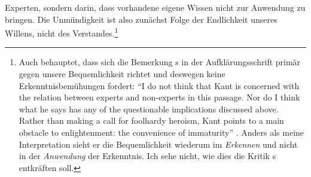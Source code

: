 Experten, sondern darin, dass vorhandene eigene Wissen nicht zur Anwendung zu
bringen. Die Unmündigkeit ist also zunächst Folge der Endlichkeit unseres
Willens, nicht des Verstandes.\footnote{Auch
 behauptet,
dass sich die Bemerkung s in der Aufklärungsschrift primär
gegen unsere Bequemlichkeit richtet und deswegen keine 
Erkenntnisbemühungen fordert: \enquote{I do not think that Kant
is concerned with the relation between experts and non-experts in this passage. Nor do I think what he says has
any of the questionable implications discussed above. Rather than making a call
for foolhardy heroism, Kant points to a main obstacle to enlightenment: the
convenience of immaturity}
\parencite[][28]{Mikalsen:TestimonyandKantsIdeaofPublicReason2010}. Anders als
meine Interpretation sieht er die Bequemlichkeit wiederum im \emph{Erkennen}
und nicht in der \emph{Anwendung} der Erkenntnis. Ich sehe nicht, wie dies die Kritik
s entkräften soll.}

